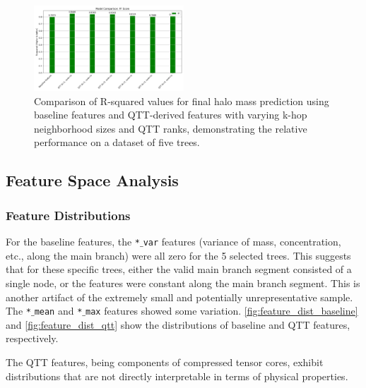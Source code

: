 \documentclass[twocolumn]{aastex631}
\begin{document}
\begin{figure}[h!]
    \centering
    \includegraphics[width=0.5\textwidth]{../input_files/plots/comparison_r2_24_20250524-175150.png}
    \caption{Comparison of R-squared values for final halo mass prediction using baseline features and QTT-derived features with varying k-hop neighborhood sizes and QTT ranks, demonstrating the relative performance on a dataset of five trees.
}
    \label{fig:comparison_r2}
\end{figure}

\subsection{Feature Space Analysis}

\subsubsection{Feature Distributions}
For the baseline features, the \texttt{*\ensuremath{\_}var} features (variance of mass, concentration, etc., along the main branch) were all zero for the 5 selected trees. This suggests that for these specific trees, either the valid main branch segment consisted of a single node, or the features were constant along the main branch segment. This is another artifact of the extremely small and potentially unrepresentative sample. The \texttt{*\ensuremath{\_}mean} and \texttt{*\ensuremath{\_}max} features showed some variation. \autoref{fig:feature_dist_baseline} and \autoref{fig:feature_dist_qtt} show the distributions of baseline and QTT features, respectively.

The QTT features, being components of compressed tensor cores, exhibit distributions that are not directly interpretable in terms of physical properties.
\end{document}
